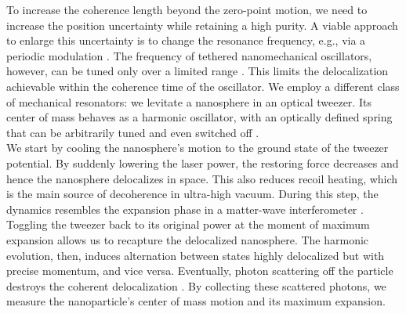 \documentclass[aps,amssymb,amsmath,prl,superscriptaddress,reprint,noshowpacs]{revtex4-1}
\begin{document}
To increase the coherence length beyond the zero-point motion, we need to increase the position uncertainty while retaining a high purity.
%
A viable approach to enlarge this uncertainty is to change the resonance frequency, e.g., via a periodic modulation \cite{rugar_mechanical_1991,blencowe_quantum_2000, mari_gently_2009, asjad_robust_2014}.
%
The frequency of tethered nanomechanical oscillators, however, can be tuned only over a limited range \cite{vinante_feedback-enhanced_2013, poot_deep_2015, mashaal_strong_2024}.
%
This limits the delocalization achievable within the coherence time of the oscillator.
%
We employ a different class of mechanical resonators: we levitate a nanosphere in an optical tweezer.
%
Its center of mass behaves as a harmonic oscillator, with an optically defined spring that can be arbitrarily tuned and even switched off \cite{romero-isart_large_2011,hebestreit_sensing_2018, frimmer_rapid_2019}. 
\\
We start by cooling the nanosphere’s motion to the ground state of the tweezer potential. 
%
By suddenly lowering the laser power, the restoring force decreases and hence the nanosphere delocalizes in space.
%
This also reduces recoil heating, which is the main source of decoherence in ultra-high vacuum.
%
During this step,  the dynamics resembles the expansion phase in a matter-wave interferometer \cite{nairz_quantum_2003}.
%
Toggling the tweezer back to its original power at the moment of maximum expansion allows us to recapture the delocalized nanosphere.
%
The harmonic evolution, then, induces alternation between states highly delocalized but with precise momentum, and vice versa. 
%
Eventually, photon scattering off the particle destroys the coherent delocalization \cite{romero-isart_quantum_2011}.
%
By collecting these scattered photons, we measure the nanoparticle's center of mass motion and its maximum expansion.
\end{document}
